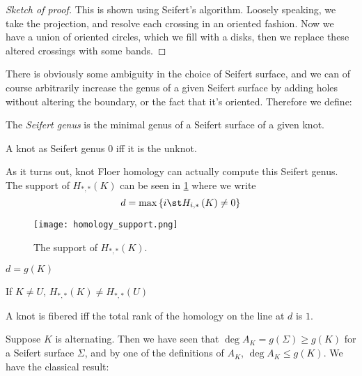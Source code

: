 \documentclass{amsproc}
\begin{document}
\begin{proof}[Sketch of proof]
This is shown using Seifert's algorithm.
Loosely speaking, we take the projection, and resolve each crossing in an oriented fashion.
Now we have a union of oriented circles, which we fill with a disks, then we replace these
altered crossings with some bands.
\end{proof}

There is obviously some ambiguity in the choice of Seifert surface, and we can of course arbitrarily increase
the genus of a given Seifert surface by adding holes without altering the boundary, or the fact
that it's oriented.
Therefore we define:

\begin{defn}
The \emph{Seifert genus} is the minimal genus of a Seifert surface of a given knot. 
\end{defn}

\begin{thm}
A knot as Seifert genus $0$ iff it is the unknot.
\end{thm}

As it turns out, knot Floer homology can actually compute this Seifert genus. 
The support of $H_{*,*}\left( K \right)$ can be seen in \cref{fig:support_of_HFK}
where we write 
\begin{equation}
d = \max\left\{ i \st H_{i,*} \left( K \right) \neq 0 \right\}
\end{equation}
\begin{figure}
\texttt{[image: homology\_support.png]}
\caption{The support of $H_{*,*}\left( K \right)$.}
\label{fig:support_of_HFK}
\end{figure}

\begin{thm}
$d = g\left( K \right)$
\end{thm}

\begin{cor}
If $K\neq U$, 
$H_{*,*}\left( K \right) \neq H_{*,*}\left( U \right)$
\end{cor}

\begin{thm}
A knot is fibered iff the total rank of the homology on the line at $d$ is $1$.
\end{thm}

Suppose $K$ is alternating.
Then we have seen that $\deg A_K = g\left(\Sigma \right) \geq g\left( K \right)$
for a Seifert surface $\Sigma$, 
and by one of the definitions of $A_K$, $\deg A_K \leq g\left( K \right)$.
We have the classical result:
\end{document}
